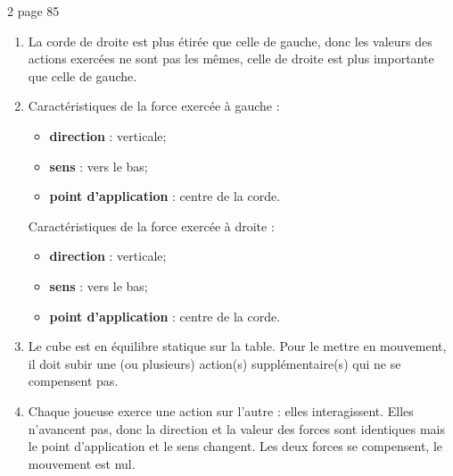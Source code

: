 \documentclass[xcolor={dvipsnames}]{beamer}
\begin{document}
\begin{frame}
\begin{myact}{2 page 85}
	\begin{enumerate}
		\item La corde de droite est plus étirée que celle de gauche, donc les valeurs des actions exercées ne sont pas les mêmes, celle de droite est plus importante que celle de gauche.
		
		\item Caractéristiques de la force exercée à gauche :\pause
		\begin{itemize}
			\item \textbf{direction} : verticale;
			\item \textbf{sens} : vers le bas;
			\item \textbf{point d'application} : centre de la corde.
		\end{itemize}
		
		Caractéristiques de la force exercée à droite :\pause
		\begin{itemize}
			\item \textbf{direction} : verticale;
			\item \textbf{sens} : vers le bas;
			\item \textbf{point d'application} : centre de la corde.
		\end{itemize}
	
	
	\end{enumerate}
\end{myact}
\end{frame}

\begin{frame}
	\begin{enumerate}
		\setcounter{enumi}{2}
		
		\item Le cube est en équilibre statique sur la table. Pour le mettre en mouvement, il doit subir une (ou plusieurs) action(s) supplémentaire(s) qui ne se compensent pas.\pause
	
		\item Chaque joueuse exerce une action sur l'autre : elles interagissent. Elles n'avancent pas, donc la direction et la valeur des forces sont identiques mais le point d'application et le sens changent. Les deux forces se compensent, le mouvement est nul.
	\end{enumerate}
\end{frame}

\begin{frame}

\end{frame}
\end{document}
